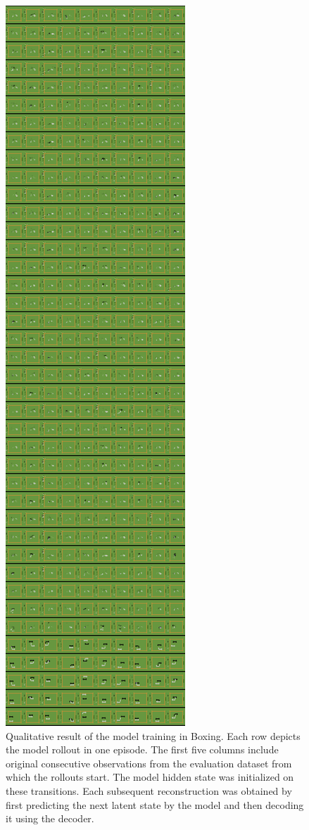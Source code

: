 \begin{figure}[H]
\includegraphics[height=0.9\textheight,keepaspectratio]{figures/PlaNet/Boxing_memory_original.png}
\caption[Qualitative result of the original PlaNet model training in Boxing]{Qualitative result of the model training in Boxing. Each row depicts the model rollout in one episode. The first five columns include original consecutive observations from the evaluation dataset from which the rollouts start. The model hidden state was initialized on these transitions. Each subsequent reconstruction was obtained by first predicting the next latent state by the model and then decoding it using the decoder.}
\label{Fig.PlaNet_Boxing_original}
\end{figure}

